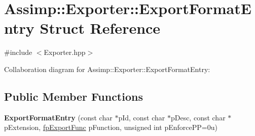 \hypertarget{struct_assimp_1_1_exporter_1_1_export_format_entry}{\section{Assimp\+:\+:Exporter\+:\+:Export\+Format\+Entry Struct Reference}
\label{struct_assimp_1_1_exporter_1_1_export_format_entry}
}


{\ttfamily \#include $<$Exporter.\+hpp$>$}



Collaboration diagram for Assimp\+:\+:Exporter\+:\+:Export\+Format\+Entry\+:
\subsection*{Public Member Functions}
\begin{DoxyCompactItemize}
\item 
\hypertarget{struct_assimp_1_1_exporter_1_1_export_format_entry_ab89610d7a5b295aa8a22bceae013d76f}{{\bfseries Export\+Format\+Entry} (const char $\ast$p\+Id, const char $\ast$p\+Desc, const char $\ast$p\+Extension, \hyperlink{class_assimp_1_1_exporter_aa67334a75cb24e030af984d01e622f3b}{fp\+Export\+Func} p\+Function, unsigned int p\+Enforce\+P\+P=0u)}\label{struct_assimp_1_1_exporter_1_1_export_format_entry_ab89610d7a5b295aa8a22bceae013d76f}

\end{DoxyCompactItemize}
